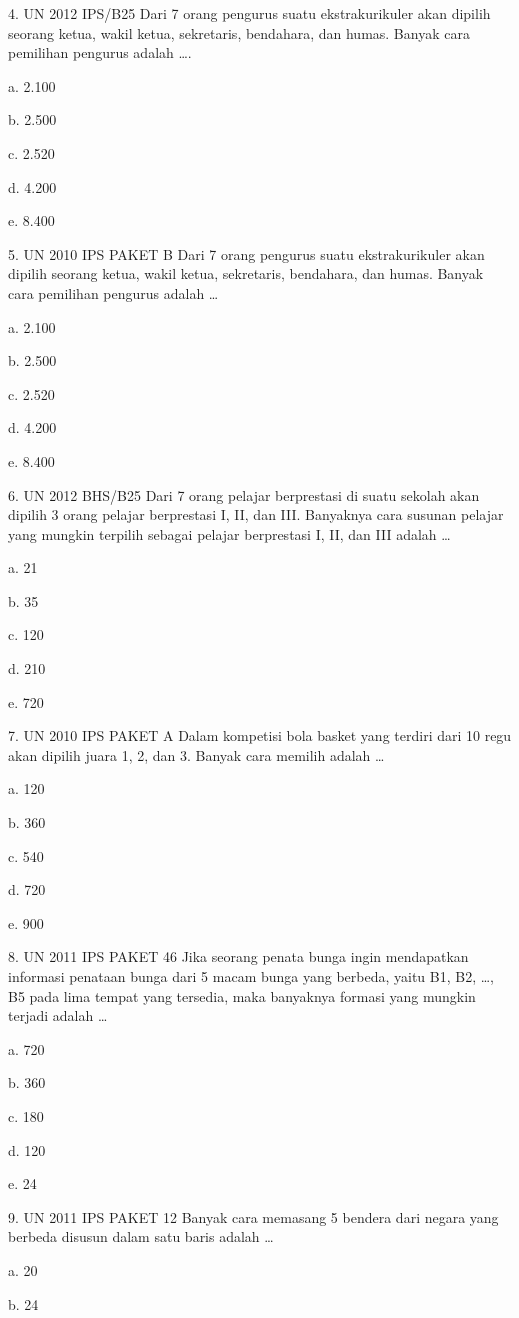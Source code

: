 \documentclass[11pt,fleqn]{book} %
\begin{document}
4.	UN 2012 IPS/B25
Dari 7 orang pengurus suatu ekstrakurikuler akan dipilih seorang ketua, wakil ketua, sekretaris, bendahara, dan humas. Banyak cara pemilihan pengurus adalah ….

a.	2.100

b.	2.500

c.	2.520


d.	4.200

e.	8.400

5.	UN 2010 IPS PAKET B 
Dari 7 orang pengurus suatu ekstrakurikuler akan dipilih seorang ketua, wakil ketua, sekretaris, bendahara, dan humas. Banyak cara pemilihan pengurus adalah …

a.	2.100

b.	2.500

c.	2.520

d.	4.200


e.	8.400

6.	UN 2012 BHS/B25
Dari 7 orang pelajar berprestasi di suatu sekolah akan dipilih 3 orang pelajar berprestasi I, II, dan III. Banyaknya cara susunan pelajar yang mungkin terpilih sebagai pelajar berprestasi I, II, dan III adalah …

a.	21

b.	35

c.	120

d.	210

e.	720


7.	UN 2010 IPS PAKET A 
Dalam kompetisi bola basket yang terdiri dari 10 regu akan dipilih juara 1, 2, dan 3. Banyak cara memilih adalah …

a.	120

b.	360

c.	540

d.	720

e.	900

8.	UN 2011 IPS PAKET 46
Jika seorang penata bunga ingin mendapatkan informasi penataan bunga dari 5 macam bunga yang berbeda, yaitu B1, B2, …, B5 pada lima tempat yang tersedia, maka banyaknya formasi yang mungkin terjadi adalah …

a.	720

b.	360

c.	180

d.	120

e.	24

9.	UN 2011 IPS PAKET 12 
Banyak cara memasang 5 bendera dari negara yang berbeda disusun dalam satu baris adalah …

a.	20

b.	24
\end{document}
